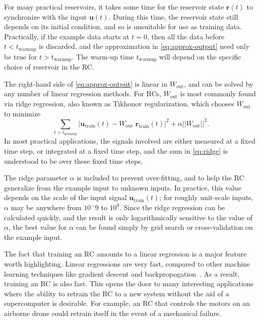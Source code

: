 For many practical reservoirs, it takes some time for the reservoir
state $\bm{r}(t)$ to synchronize with the input $\bm{u}(t)$. During
this time, the reservoir state still depends on its initial condition,
and so is unsuitable for use as training data. Practically, if the
example data starts at $t = 0$, then all the data before $t <
t_\text{warmup}$ is discarded, and the approximation in
\cref{eq:approx-output} need only be true for $t >
t_\text{warmup}$. The warm-up time $t_\text{warmup}$ will depend on the
specific choice of reservoir in the RC.

The right-hand side of \cref{eq:approx-output} is linear in
$W_\text{out}$, and can be solved by any number of linear regression
methods. For RCs, $W_\text{out}$ is most commonly found via ridge
regression, also known as Tikhonov regularization, which chooses
$W_\text{out}$ to minimize
\begin{equation}
  \label{eq:ridge}
  \sum_{t>t_\text{warmup}} |\mathbf{u}_\text{train}(t) - W_\text{out}\;\mathbf{r}_\text{train}(t)|^2 + \alpha ||W_\text{out}||^2.
\end{equation}
In most practical applications, the signals involved are either
measured at a fixed time step, or integrated at a fixed time step, and
the sum in \cref{eq:ridge} is understood to be over these fixed time
steps.

The ridge parameter $\alpha$ is included to prevent over-fitting, and
to help the RC generalize from the example input to unknown inputs. In
practice, this value depends on the scale of the input signal
$\bm{u}_\text{train}(t)$; for roughly unit-scale inputs, $\alpha$ may be
anywhere from $10^-{9}$ to $10^9$. Since the ridge regression can be
calculated quickly, and the result is only logarithmically sensitive
to the value of $\alpha$, the best value for $\alpha$ can be found
simply by grid search or cross-validation on the example input.

The fact that training an RC amounts to a linear regression is a major
feature worth highlighting. Linear regressions are very fast, compared
to other machine learning techniques like gradient descent and
backpropogation~\cite{lukosevicius2009}. As a result, training an RC
is also fast. This opens the door to many interesting applications
where the ability to retrain the RC to a new system without the aid of
a supercomputer is desirable. For example, an RC that controls the
motors on an airborne drone could retrain itself in the event of a
mechanical failure.

